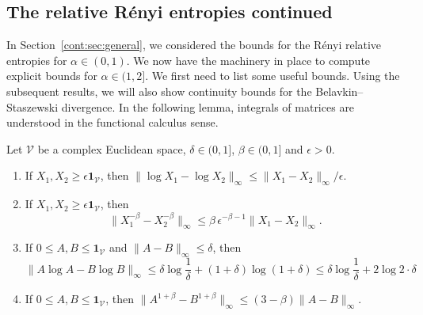 \subsection{The relative R\'enyi entropies continued}
In Section~\ref{cont:sec:general}, we considered the bounds for the R\'enyi relative entropies for $\alpha\in (0,1)$. We now have the machinery in place to compute explicit bounds for $\alpha\in (1,2]$. We first need to list some useful bounds. Using the subsequent results, we will also show continuity bounds for the Belavkin--Staszewski divergence. In the following lemma, integrals of matrices are understood in the functional calculus sense. 

\begin{lemma}\label{cont:lem:unb moduli}
Let $\mathcal{V}$ be a complex Euclidean space, $\delta\in(0,1]$, $\beta\in(0,1]$ and $\epsilon>0$.
\begin{enumerate}
\item If $X_1,X_2\geq\epsilon\mathbf{1}_{\mathcal{V}}$, then $\|\log X_1-\log X_2\|_\infty\leq\|X_1-X_2\|_\infty/\epsilon$.
\item If $X_1,X_2\geq\epsilon\mathbf{1}_{\mathcal{V}}$, then
\[
\|X_1^{-\beta}-X_2^{-\beta}\|_\infty\leq\beta\,\epsilon^{-\beta-1}\|X_1-X_2\|_\infty.
\]
\item If $0\leq A,B\leq\mathbf{1}_{\mathcal{V}}$ and $\|A-B\|_\infty\leq\delta$, then \[\|A\log A-B\log B\|_\infty\leq\delta\log\frac1\delta+(1+\delta)\log(1+\delta)\leq\delta\log\frac1\delta+2\log2\cdot\delta\]
\item If $0\leq A,B\leq\mathbf{1}_{\mathcal{V}}$, then $\|A^{1+\beta}-B^{1+\beta}\|_\infty\leq(3-\beta)\|A-B\|_\infty$.
\end{enumerate}
\end{lemma}

